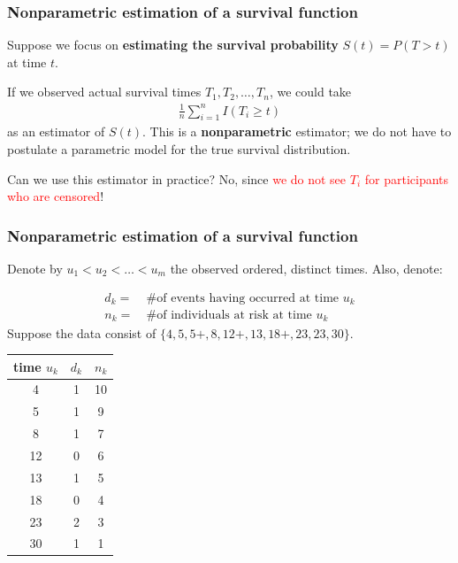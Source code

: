 \documentclass[12pt, 
hyperref={colorlinks=true, linkcolor=blue, urlcolor=cyan},dvipsnames]{beamer}
\begin{document}
\begin{frame}
\frametitle{Nonparametric estimation of a survival function}

Suppose we focus on \textbf{estimating the survival probability} $S(t) = P(T > t)$ at time $t$.

If we observed actual survival times $T_1, T_2, \dots, T_n$, we could take
\begin{align*}
\frac{1}{n}\sum_{i=1}^n I(T_i \geq t)
\end{align*}
as an estimator of $S(t)$. This is a \textbf{nonparametric} estimator; we do not have to postulate a parametric model for the true survival distribution.

Can we use this estimator in practice? \pause No, since \textcolor{red}{we do not see $T_i$ for participants who are censored}!
\end{frame}

\begin{frame}
\frametitle{Nonparametric estimation of a survival function}

{\small Denote by $u_1 < u_2 < \dots < u_m$ the observed ordered, distinct times. Also, denote: \vspace{-1cm}

\begin{align*}
d_k = & \ \text{\# of events having occurred at time $u_k$} \\
n_k = & \ \text{\# of individuals at risk at time $u_k$}
\end{align*}
\vspace{-0.5cm}
Suppose the data consist of $\{4, 5, 5+, 8, 12+, 13, 18+, 23, 23, 30\}$.

\begin{center}
\begin{tabular}{|c|c|c|}
\hline
time $u_k$ & $d_k$ & $n_k$ \\
\hline
4 & 1 & 10 \\
5 & 1 & 9 \\
8 & 1 & 7 \\
12 & 0 & 6 \\
13 & 1 & 5 \\
18 & 0 & 4 \\
23 & 2 & 3 \\
30 & 1 & 1 \\
\hline
\end{tabular}
\end{center}
}
\end{frame}
\end{document}

